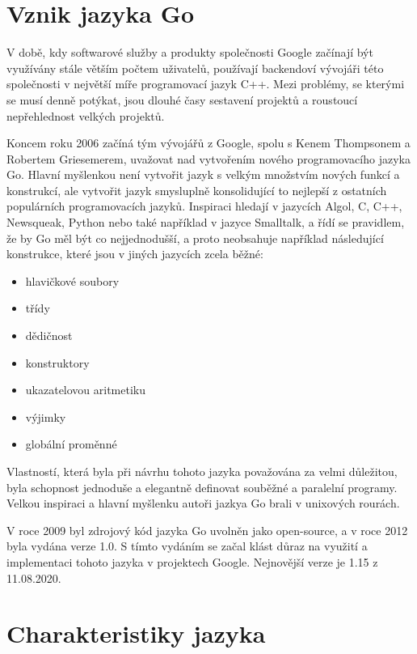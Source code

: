 \documentclass[12pt, a4paper]{article}
\let\oldsection\section
\renewcommand\section{\clearpage\oldsection}
\begin{document}
    \tableofcontents
    \pagebreak
    
    \section{Vznik jazyka Go}

 V době, kdy softwarové služby a produkty společnosti Google začínají být využívány stále větším počtem uživatelů, používají backendoví vývojáři této společnosti v největší míře programovací jazyk C++. Mezi problémy, se kterými se musí denně potýkat, jsou dlouhé časy sestavení projektů a roustoucí nepřehlednost velkých projektů.

Koncem roku 2006 začíná tým vývojářů z Google, spolu s Kenem Thompsonem a Robertem Griesemerem, uvažovat nad vytvořením nového programovacího jazyka Go.  Hlavní myšlenkou není vytvořit jazyk s velkým množstvím nových funkcí a konstrukcí, ale vytvořit jazyk smysluplně konsolidující to nejlepší z ostatních populárních programovacích jazyků. Inspiraci hledají v jazycích Algol, C, C++, Newsqueak, Python nebo také například v jazyce Smalltalk, a řídí se pravidlem, že by Go měl být co nejjednodušší, a proto neobsahuje například následující konstrukce, které jsou v jiných jazycích zcela běžné:

\begin{itemize}
    \item hlavičkové soubory
    \item třídy
    \item dědičnost 
    \item konstruktory
    \item ukazatelovou aritmetiku
    \item výjimky
    \item globální proměnné
\end{itemize}

Vlastností, která byla při návrhu tohoto jazyka považována za velmi důležitou, byla schopnost jednoduše a elegantně definovat souběžné a paralelní programy. Velkou inspiraci a hlavní myšlenku autoři jazkya Go brali v unixových rourách.

V roce 2009 byl zdrojový kód jazyka Go uvolněn jako open-source, a v roce 2012 byla vydána verze 1.0. S tímto vydáním se začal klást důraz na využití a implementaci tohoto jazyka v projektech Google. Nejnovější verze je 1.15 z 11.08.2020.

\section{Charakteristiky jazyka}
\end{document}
